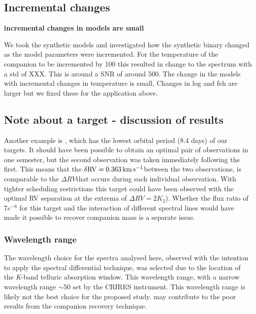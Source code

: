 \subsection{Incremental changes}
\textbf{incremental changes in models are small}

We took the synthetic models and investigated how the synthetic binary changed as the model parameters were incremented.  For the temperature of the companion to be incremented by 100\K{} this resulted in change to the spectrum with a std of XXX. This is around a {SNR} of around 500.
The change in the models with incremental changes in temperature is small, Changes in log and feh are larger but we fixed these for the application above.





\subsection{Note about a target - discussion of results}
Another example is , which has the lowest orbital period (8.4 days) of our targets. It should have been possible to obtain an optimal pair of observations in one semester, but the second observation was taken immediately following the first. This means that the \(\rm \delta {RV} = 0.363\,\si{\kilo\meter\per\second}{}\)between the two observations, is comparable to the \(\Delta {RV}\)that occurs during each individual observation. With tighter scheduling restrictions this target could have been observed with the optimal {RV} separation at the extrema of \(\Delta {RV}=2 K_{2}\)). Whether the flux ratio of \(7e^{-6}\) for this target and the interaction of different spectral lines would have made it possible to recover companion mass is a separate issue.



\subsubsection{Wavelength range}
The wavelength choice for the spectra analysed here, observed with the intention to apply the spectral differential technique, was selected due to the location of the \emph{K}-band telluric absorption window. This wavelength range, with a narrow wavelength range \(\sim50\)\nm{} set by the {CRIRES} instrument. This wavelength range is likely not the best choice for the proposed study.  may contribute to the poor results from the companion recovery technique.

